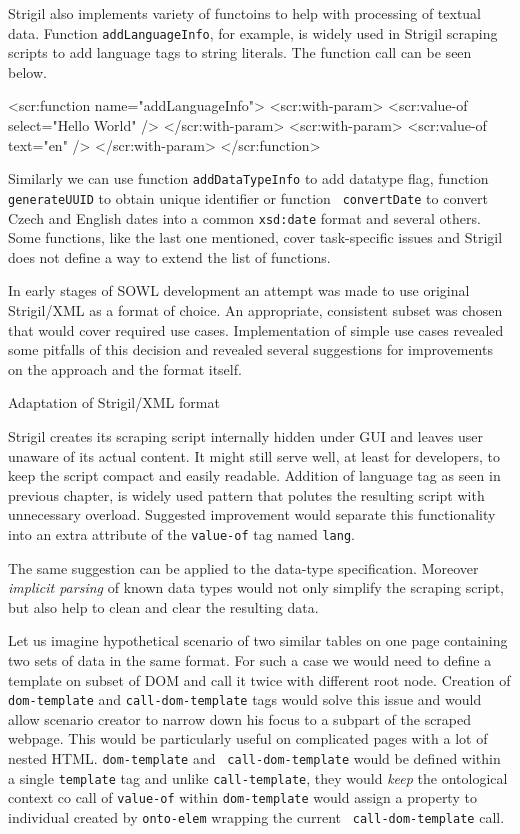 Strigil also implements variety of functoins to help with processing of textual
data. Function {\tt addLanguageInfo}, for example, is widely used in Strigil
scraping scripts to add language tags to string literals. The function call can
be seen below. 

\begtt
<scr:function name="addLanguageInfo">
  <scr:with-param>
    <scr:value-of select="Hello World" />
  </scr:with-param>
  <scr:with-param>
    <scr:value-of text="en" />
  </scr:with-param>
</scr:function>
\endtt

Similarly we can use function {\tt addDataTypeInfo} to add datatype flag,
function {\tt generateUUID} to obtain unique identifier or function {\tt
convertDate} to convert Czech and English dates into a common {\tt xsd:date}
format and several others. Some functions, like the last one mentioned, cover
task-specific issues and Strigil does not define a way to extend the list of
functions. 

In early stages of SOWL development an attempt was made to use original
Strigil/XML as a format of choice. An appropriate, consistent subset was chosen
that would cover required use cases. Implementation of simple use cases
revealed some pitfalls of this decision and revealed several suggestions for
improvements on the approach and the format itself. 


\secc Adaptation of Strigil/XML format

Strigil creates its scraping script internally hidden under GUI and leaves
user unaware of its actual content. It might still serve well, at least for
developers, to keep the script compact and easily readable. Addition of
language tag as seen in previous chapter, is widely used pattern that polutes
the resulting script with unnecessary overload. Suggested improvement would
separate this functionality into an extra attribute of the {\tt value-of} tag
named {\tt lang}.

The same suggestion can be applied to the data-type specification. Moreover
{\em implicit parsing} of known data types would not only simplify the scraping
script, but also help to clean and clear the resulting data. 

Let us imagine hypothetical scenario of two similar tables on one page
containing two sets of data in the same format. For such a case we would need
to define a template on subset of DOM and call it twice with different root
node. Creation of {\tt dom-template} and {\tt call-dom-template} tags would
solve this issue and would allow scenario creator to narrow down his focus to a
subpart of the scraped webpage. This would be particularly useful on
complicated pages with a lot of nested HTML. {\tt dom-template} and {\tt
call-dom-template} would be defined within a single {\tt template} tag and
unlike {\tt call-template}, they would {\em keep} the ontological context co
call of {\tt value-of} within {\tt dom-template} would assign a property to
individual created by {\tt onto-elem} wrapping the current {\tt
call-dom-template} call. 

